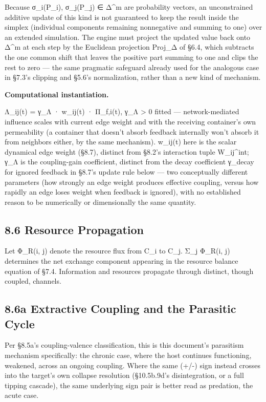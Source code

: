 \documentclass[
]{article}
\begin{document}
Because σ\_i(P\_i), σ\_j(P\_j) ∈ Δ\^{}m are probability vectors, an
unconstrained additive update of this kind is not guaranteed to keep the
result inside the simplex (individual components remaining nonnegative
and summing to one) over an extended simulation. The engine must project
the updated value back onto Δ\^{}m at each step by the Euclidean
projection Proj\_Δ of §6.4, which subtracts the one common shift that
leaves the positive part summing to one and clips the rest to zero ---
the same pragmatic safeguard already used for the analogous case in
§7.3's clipping and §5.6's normalization, rather than a new kind of
mechanism.

\textbf{Computational instantiation.}

Λ\_ij(t) = γ\_Λ · w\_ij(t) · Π\_f,i(t), γ\_Λ \textgreater{} 0 fitted ---
network-mediated influence scales with current edge weight and with the
receiving container's own permeability (a container that doesn't absorb
feedback internally won't absorb it from neighbors either, by the same
mechanism). w\_ij(t) here is the scalar dynamical edge weight (§8.7),
distinct from §8.2's interaction tuple W\_ij\^{}int; γ\_Λ is the
coupling-gain coefficient, distinct from the decay coefficient γ\_decay
for ignored feedback in §8.7's update rule below --- two conceptually
different parameters (how strongly an edge weight produces effective
coupling, versus how rapidly an edge loses weight when feedback is
ignored), with no established reason to be numerically or dimensionally
the same quantity.

\hypertarget{resource-propagation}{%
\subsection{8.6 Resource Propagation}\label{resource-propagation}}

Let Φ\_R(i, j) denote the resource flux from C\_i to C\_j. Σ\_j Φ\_R(i,
j) determines the net exchange component appearing in the resource
balance equation of §7.4. Information and resources propagate through
distinct, though coupled, channels.

\hypertarget{a-extractive-coupling-and-the-parasitic-cycle}{%
\subsection{8.6a Extractive Coupling and the Parasitic
Cycle}\label{a-extractive-coupling-and-the-parasitic-cycle}}

Per §8.5a's coupling-valence classification, this is this document's
parasitism mechanism specifically: the chronic case, where the host
continues functioning, weakened, across an ongoing coupling. Where the
same (+/-) sign instead crosses into the target's own collapse
resolution (§10.5b.9d's disintegration, or a full tipping cascade), the
same underlying sign pair is better read as predation, the acute case.
\end{document}
